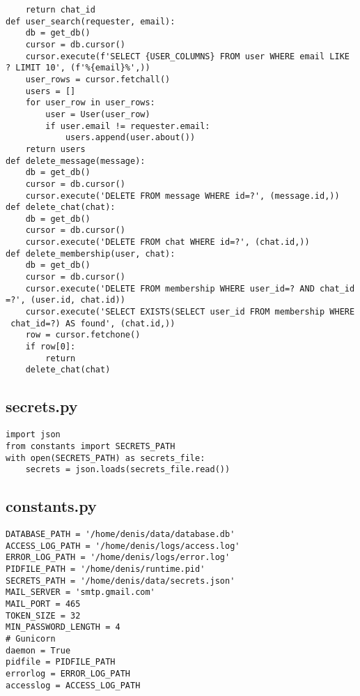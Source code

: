 \documentclass[listing]{espd}
\begin{document}
\begin{verbatim}
    return chat_id
def user_search(requester, email):
    db = get_db()
    cursor = db.cursor()
    cursor.execute(f'SELECT {USER_COLUMNS} FROM user WHERE email LIKE 
? LIMIT 10', (f'%{email}%',))
    user_rows = cursor.fetchall()
    users = []
    for user_row in user_rows:
        user = User(user_row)
        if user.email != requester.email:
            users.append(user.about())
    return users
def delete_message(message):
    db = get_db()
    cursor = db.cursor()
    cursor.execute('DELETE FROM message WHERE id=?', (message.id,))
def delete_chat(chat):
    db = get_db()
    cursor = db.cursor()
    cursor.execute('DELETE FROM chat WHERE id=?', (chat.id,))
def delete_membership(user, chat):
    db = get_db()
    cursor = db.cursor()
    cursor.execute('DELETE FROM membership WHERE user_id=? AND chat_id
=?', (user.id, chat.id))
    cursor.execute('SELECT EXISTS(SELECT user_id FROM membership WHERE
 chat_id=?) AS found', (chat.id,))
    row = cursor.fetchone()
    if row[0]:
        return
    delete_chat(chat)
\end{verbatim}

\subsection{secrets.py}
\begin{verbatim}
import json
from constants import SECRETS_PATH
with open(SECRETS_PATH) as secrets_file:
    secrets = json.loads(secrets_file.read())
\end{verbatim}

\subsection{constants.py}
\begin{verbatim}
DATABASE_PATH = '/home/denis/data/database.db'
ACCESS_LOG_PATH = '/home/denis/logs/access.log'
ERROR_LOG_PATH = '/home/denis/logs/error.log'
PIDFILE_PATH = '/home/denis/runtime.pid'
SECRETS_PATH = '/home/denis/data/secrets.json'
MAIL_SERVER = 'smtp.gmail.com'
MAIL_PORT = 465
TOKEN_SIZE = 32
MIN_PASSWORD_LENGTH = 4
# Gunicorn
daemon = True
pidfile = PIDFILE_PATH
errorlog = ERROR_LOG_PATH
accesslog = ACCESS_LOG_PATH
\end{verbatim}
\end{document}
